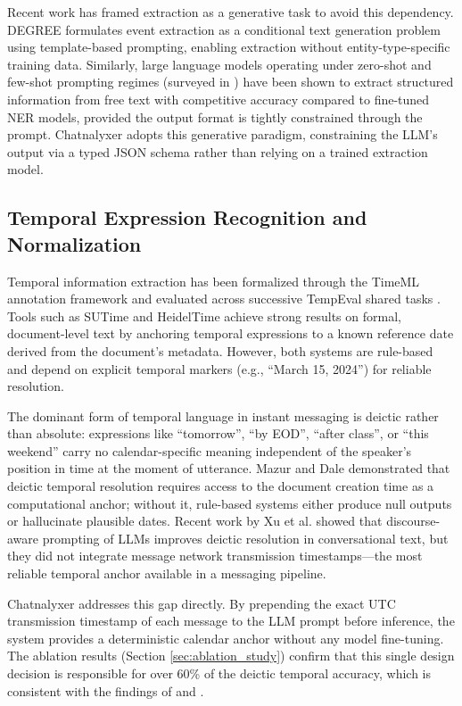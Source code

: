 Recent work has framed extraction as a generative task to avoid this dependency. DEGREE \cite{hsu2022degree} formulates event extraction as a conditional text generation problem using template-based prompting, enabling extraction without entity-type-specific training data. Similarly, large language models operating under zero-shot and few-shot prompting regimes (surveyed in \cite{wei2022emergent}) have been shown to extract structured information from free text with competitive accuracy compared to fine-tuned NER models, provided the output format is tightly constrained through the prompt. Chatnalyxer adopts this generative paradigm, constraining the LLM's output via a typed JSON schema rather than relying on a trained extraction model.

\subsection{Temporal Expression Recognition and Normalization}

Temporal information extraction has been formalized through the TimeML annotation framework \cite{pustejovsky2003timeml} and evaluated across successive TempEval shared tasks \cite{uzzaman2013semeval}. Tools such as SUTime \cite{chang2012sutime} and HeidelTime \cite{strotgen2010heideltime} achieve strong results on formal, document-level text by anchoring temporal expressions to a known reference date derived from the document's metadata. However, both systems are rule-based and depend on explicit temporal markers (e.g., ``March 15, 2024'') for reliable resolution.

The dominant form of temporal language in instant messaging is deictic rather than absolute: expressions like ``tomorrow'', ``by EOD'', ``after class'', or ``this weekend'' carry no calendar-specific meaning independent of the speaker's position in time at the moment of utterance. Mazur and Dale \cite{mazur2010wikiwars} demonstrated that deictic temporal resolution requires access to the document creation time as a computational anchor; without it, rule-based systems either produce null outputs or hallucinate plausible dates. Recent work by Xu et al. \cite{xu2021discourse} showed that discourse-aware prompting of LLMs improves deictic resolution in conversational text, but they did not integrate message network transmission timestamps—the most reliable temporal anchor available in a messaging pipeline.

Chatnalyxer addresses this gap directly. By prepending the exact UTC transmission timestamp of each message to the LLM prompt before inference, the system provides a deterministic calendar anchor without any model fine-tuning. The ablation results (Section \ref{sec:ablation_study}) confirm that this single design decision is responsible for over 60\% of the deictic temporal accuracy, which is consistent with the findings of \cite{mazur2010wikiwars} and \cite{xu2021discourse}.

